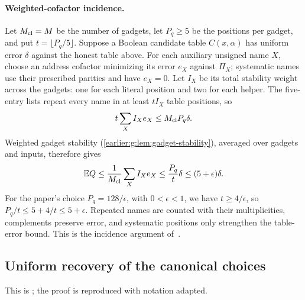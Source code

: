 \paragraph{Weighted-cofactor incidence.}\label{earlier:weighted-incidence}
Let \(M_{\rm cl}=M\) be the number of gadgets, let \(P_q\ge5\) be the positions per gadget, and put \(t=\lfloor P_q/5\rfloor\).
Suppose a Boolean candidate table \(C(x,\alpha)\) has uniform error \(\delta\) against the honest table above. For each auxiliary unsigned name \(X\), choose an address cofactor minimizing its error \(e_X\) against \(\Pi_X\); systematic names use their prescribed parities and have \(e_X=0\).
Let \(I_X\) be its total stability weight across the gadgets: one for each literal position and two for each helper. The five-entry lists repeat every name in at least \(tI_X\) table positions, so
\[
 t\sum_X I_Xe_X\le M_{\rm cl}P_q\delta.
\]
Weighted gadget stability (\cref{earlier:g:lem:gadget-stability}), averaged over gadgets and inputs, therefore gives
\[
 \mathbb E Q\le\frac1{M_{\rm cl}}\sum_X I_Xe_X
 \le\frac{P_q}{t}\delta\le(5+\epsilon)\delta.
\]
For the paper's choice \(P_q=128/\epsilon\), with \(0<\epsilon<1\), we have \(t\ge4/\epsilon\), so \(P_q/t\le5+4/t\le5+\epsilon\).
Repeated names are counted with their multiplicities, complements preserve error, and systematic positions only strengthen the table-error bound. This is the incidence argument of~\cite[Equation~(18)]{NagCG}.

\subsection{Uniform recovery of the canonical choices}\label{earlier:uniform-recovery}
This is \cite[Section~11.6]{NagCG}; the proof is reproduced with
notation adapted. 


